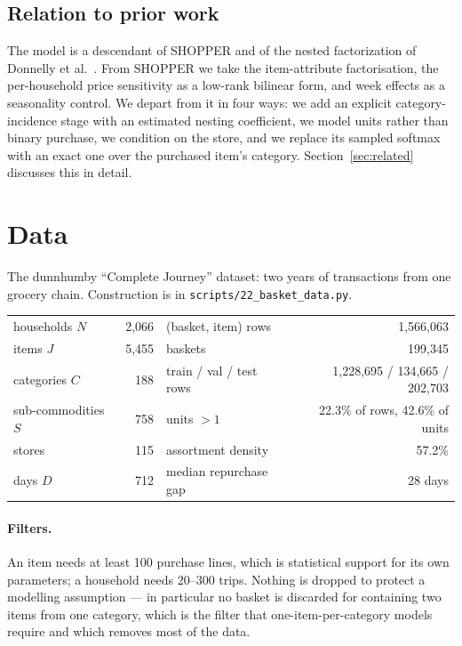 \documentclass[11pt]{article}
\newcommand{\code}[1]{\texttt{#1}}
\begin{document}
\subsection{Relation to prior work}

The model is a descendant of SHOPPER \cite{shopper} and of the nested factorization of
Donnelly et al.\ \cite{nf}. From SHOPPER we take the item-attribute factorisation, the
per-household price sensitivity as a low-rank bilinear form, and week effects as a
seasonality control. We depart from it in four ways: we add an explicit category-incidence stage
with an estimated nesting coefficient, we model units rather than binary purchase, we
condition on the store, and we replace its sampled softmax with an exact one over the
purchased item's category. Section~\ref{sec:related} discusses this in detail.

\section{Data}
\label{sec:data}

The dunnhumby ``Complete Journey'' dataset: two years of transactions from one grocery
chain. Construction is in \code{scripts/22\_basket\_data.py}.

\begin{center}
\begin{tabular}{lr@{\qquad}lr}
\toprule
households $N$ & 2,066 & (basket, item) rows & 1,566,063 \\
items $J$ & 5,455 & baskets & 199,345 \\
categories $C$ & 188 & train / val / test rows & 1,228,695 / 134,665 / 202,703 \\
sub-commodities $S$ & 758 & units $>1$ & 22.3\% of rows, 42.6\% of units \\
stores & 115 & assortment density & 57.2\% \\
days $D$ & 712 & median repurchase gap & 28 days \\
\bottomrule
\end{tabular}
\end{center}

\paragraph{Filters.} An item needs at least 100 purchase lines, which is
statistical support for its own parameters; a household needs 20--300 trips.
Nothing is dropped to protect a modelling assumption --- in particular no basket is
discarded for containing two items from one category, which is the filter that
one-item-per-category models require and which removes most of the data.
\end{document}
